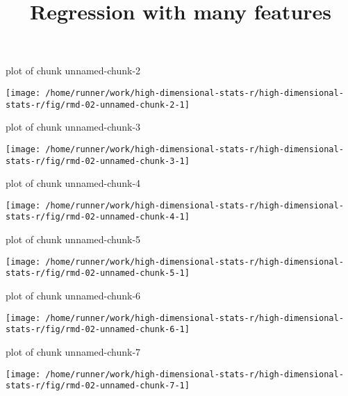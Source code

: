 \documentclass[ignorenonframetext,]{beamer}
\title{Regression with many features}
\author{}
\date{\vspace{-2.5em}}
\begin{document}
\frame{\titlepage}

\begin{frame}{plot of chunk unnamed-chunk-2}
\protect\hypertarget{plot-of-chunk-unnamed-chunk-2}{}

\texttt{[image: /home/runner/work/high-dimensional-stats-r/high-dimensional-stats-r/fig/rmd-02-unnamed-chunk-2-1]}



\end{frame}

\begin{frame}{plot of chunk unnamed-chunk-3}
\protect\hypertarget{plot-of-chunk-unnamed-chunk-3}{}

\texttt{[image: /home/runner/work/high-dimensional-stats-r/high-dimensional-stats-r/fig/rmd-02-unnamed-chunk-3-1]}



\end{frame}

\begin{frame}{plot of chunk unnamed-chunk-4}
\protect\hypertarget{plot-of-chunk-unnamed-chunk-4}{}

\texttt{[image: /home/runner/work/high-dimensional-stats-r/high-dimensional-stats-r/fig/rmd-02-unnamed-chunk-4-1]}



\end{frame}

\begin{frame}{plot of chunk unnamed-chunk-5}
\protect\hypertarget{plot-of-chunk-unnamed-chunk-5}{}

\texttt{[image: /home/runner/work/high-dimensional-stats-r/high-dimensional-stats-r/fig/rmd-02-unnamed-chunk-5-1]}



\end{frame}

\begin{frame}{plot of chunk unnamed-chunk-6}
\protect\hypertarget{plot-of-chunk-unnamed-chunk-6}{}

\texttt{[image: /home/runner/work/high-dimensional-stats-r/high-dimensional-stats-r/fig/rmd-02-unnamed-chunk-6-1]}



\end{frame}

\begin{frame}{plot of chunk unnamed-chunk-7}
\protect\hypertarget{plot-of-chunk-unnamed-chunk-7}{}

\texttt{[image: /home/runner/work/high-dimensional-stats-r/high-dimensional-stats-r/fig/rmd-02-unnamed-chunk-7-1]}



\end{frame}
\end{document}
